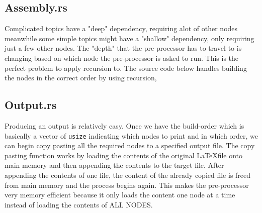 \documentclass[a4paper, 12pt]{report}
\begin{document}
\begin{center}
\subsection{Assembly.rs}
\begin{comment}
In principle, the Algorithm the pre-processor is quite simple. Given the Node and certain user-specific settings, the algorithm will navigate through all of the possible directories and files all throughout the Archives to then fetch all of the Nodes which are pre-requisites to the Given Node. The algorithm will then dump all of those data into a fully fledge \LaTeX file at which the user can compile to see the final result. This way, if the user wants to make notes or whatever, they can directly modify the source code of the document they are seeing.
\end{comment}
Complicated topics have a "deep" dependency, requiring alot of other nodes meanwhile some simple topics might have a "shallow" dependency, only requiring just a few other nodes. 
The "depth" that the pre-processor has to travel to is changing based on which node the pre-processor is asked to run.
This is the perfect problem to apply recursion to.
The source code below handles building the nodes in the correct order by using recursion,


\subsection{Output.rs}
\begin{comment}
\end{comment}
Producing an output is relatively easy.
Once we have the build-order which is basically a vector of \texttt{usize} indicating which nodes to print and in which order, we can begin copy pasting all the required nodes to a specified output file.
The copy pasting function works by loading the contents of the original \LaTeX file onto main memory and then appending the contents to the target file.
After appending the contents of one file, the content of the already copied file is freed from main memory and the process begins again.
This makes the pre-processor very memory efficient because it only loads the content one node at a time instead of loading the contents of ALL NODES.





\end{center}
\end{document}
